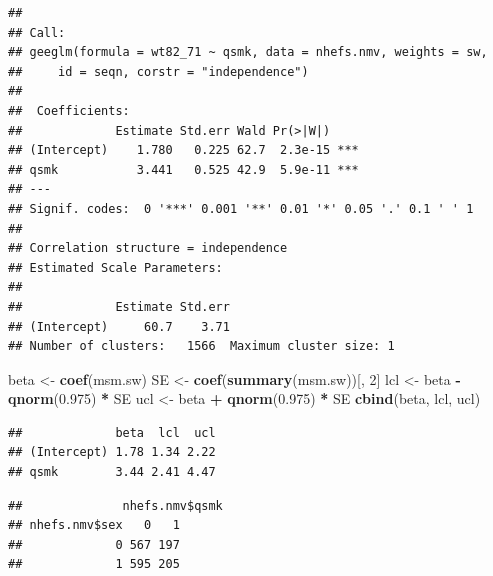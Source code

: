 \documentclass[
  10pt,
]{book}
\newenvironment{Shaded}{\begin{snugshade}}{\end{snugshade}}
\newcommand{\CommentTok}[1]{\textcolor[rgb]{0.56,0.35,0.01}{\textit{#1}}}
\newcommand{\DecValTok}[1]{\textcolor[rgb]{0.00,0.00,0.81}{#1}}
\newcommand{\FloatTok}[1]{\textcolor[rgb]{0.00,0.00,0.81}{#1}}
\newcommand{\KeywordTok}[1]{\textcolor[rgb]{0.13,0.29,0.53}{\textbf{#1}}}
\newcommand{\NormalTok}[1]{#1}
\newcommand{\OperatorTok}[1]{\textcolor[rgb]{0.81,0.36,0.00}{\textbf{#1}}}
\newcommand{\StringTok}[1]{\textcolor[rgb]{0.31,0.60,0.02}{#1}}
\begin{document}
\begin{verbatim}
## 
## Call:
## geeglm(formula = wt82_71 ~ qsmk, data = nhefs.nmv, weights = sw, 
##     id = seqn, corstr = "independence")
## 
##  Coefficients:
##             Estimate Std.err Wald Pr(>|W|)    
## (Intercept)    1.780   0.225 62.7  2.3e-15 ***
## qsmk           3.441   0.525 42.9  5.9e-11 ***
## ---
## Signif. codes:  0 '***' 0.001 '**' 0.01 '*' 0.05 '.' 0.1 ' ' 1
## 
## Correlation structure = independence 
## Estimated Scale Parameters:
## 
##             Estimate Std.err
## (Intercept)     60.7    3.71
## Number of clusters:   1566  Maximum cluster size: 1
\end{verbatim}

\begin{Shaded}
\begin{Highlighting}[]
\NormalTok{beta \textless{}{-}}\StringTok{ }\KeywordTok{coef}\NormalTok{(msm.sw)}
\NormalTok{SE \textless{}{-}}\StringTok{ }\KeywordTok{coef}\NormalTok{(}\KeywordTok{summary}\NormalTok{(msm.sw))[, }\DecValTok{2}\NormalTok{]}
\NormalTok{lcl \textless{}{-}}\StringTok{ }\NormalTok{beta }\OperatorTok{{-}}\StringTok{ }\KeywordTok{qnorm}\NormalTok{(}\FloatTok{0.975}\NormalTok{) }\OperatorTok{*}\StringTok{ }\NormalTok{SE}
\NormalTok{ucl \textless{}{-}}\StringTok{ }\NormalTok{beta }\OperatorTok{+}\StringTok{ }\KeywordTok{qnorm}\NormalTok{(}\FloatTok{0.975}\NormalTok{) }\OperatorTok{*}\StringTok{ }\NormalTok{SE}
\KeywordTok{cbind}\NormalTok{(beta, lcl, ucl)}
\end{Highlighting}
\end{Shaded}

\begin{verbatim}
##             beta  lcl  ucl
## (Intercept) 1.78 1.34 2.22
## qsmk        3.44 2.41 4.47
\end{verbatim}

\begin{Shaded}
\end{Shaded}

\begin{verbatim}
##              nhefs.nmv$qsmk
## nhefs.nmv$sex   0   1
##             0 567 197
##             1 595 205
\end{verbatim}
\end{document}
